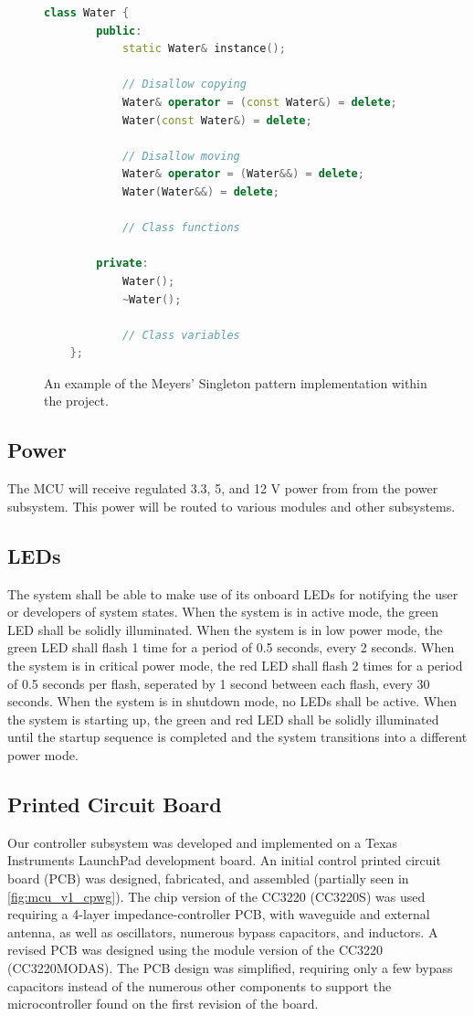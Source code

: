 \begin{figure}
    \centering
    \label{fig:singleton_implementation}

\begin{lstlisting}[language=C++]
    class Water { 
        public:
            static Water& instance();

            // Disallow copying
            Water& operator = (const Water&) = delete;
            Water(const Water&) = delete;

            // Disallow moving
            Water& operator = (Water&&) = delete;
            Water(Water&&) = delete;

            // Class functions
        
        private:
            Water();
            ~Water();

            // Class variables
    };
\end{lstlisting}
\caption{An example of the Meyers' Singleton pattern implementation within the project.}
\end{figure}

\subsection{Power}
The MCU will receive regulated 3.3, 5, and 12 V power from from the power subsystem. This power will be routed to various modules and other subsystems.

\subsection{LEDs} The system shall be able to make use of its onboard LEDs for notifying the user or developers of system states. When the system is in active mode, the green LED shall be solidly illuminated. When the system is in low power mode, the green LED shall flash 1 time for a period of 0.5 seconds, every 2 seconds. When the system is in critical power mode, the red LED shall flash 2 times for a period of 0.5 seconds per flash, seperated by 1 second between each flash, every 30 seconds. When the system is in shutdown mode, no LEDs shall be active. When the system is starting up, the green and red LED shall be solidly illuminated until the startup sequence is completed and the system transitions into a different power mode.

\subsection{Printed Circuit Board} Our controller subsystem was developed and implemented on a Texas Instruments LaunchPad development board. An initial control printed circuit board (PCB) was designed, fabricated, and assembled (partially seen in \ref{fig:mcu_v1_cpwg}). The chip version of the CC3220 (CC3220S) was used requiring a 4-layer impedance-controller PCB, with waveguide and external antenna, as well as oscillators, numerous bypass capacitors, and inductors. A revised PCB was designed using the module version of the CC3220 (CC3220MODAS). The PCB design was simplified, requiring only a few bypass capacitors instead of the numerous other components to support the microcontroller found on the first revision of the board.

